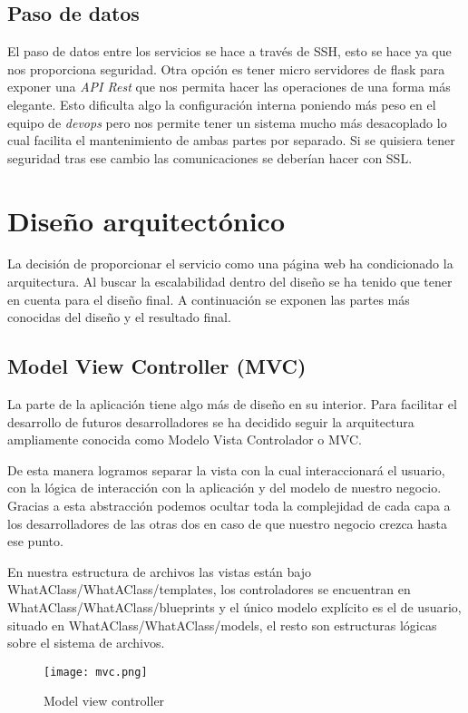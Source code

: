 \subsection{Paso de datos}

El paso de datos entre los servicios se hace a través de SSH, esto se hace ya que nos proporciona seguridad. Otra opción es tener micro servidores de flask para exponer una \emph{API Rest} que nos permita hacer las operaciones de una forma más elegante. Esto dificulta algo la configuración interna poniendo más peso en el equipo de \emph{devops} pero nos permite tener un sistema mucho más desacoplado lo cual facilita el mantenimiento de ambas partes por separado. Si se quisiera tener seguridad tras ese cambio las comunicaciones se deberían hacer con SSL. 


\section{Diseño arquitectónico}
La decisión de proporcionar el servicio como una página web ha condicionado la arquitectura. Al buscar la escalabilidad dentro del diseño se ha tenido que tener en cuenta para el diseño final. A continuación se exponen las partes más conocidas del diseño y el resultado final.

\subsection{Model View Controller (MVC)}

La parte de la aplicación tiene algo más de diseño en su interior. Para facilitar el desarrollo de futuros desarrolladores se ha decidido seguir la arquitectura ampliamente conocida como Modelo Vista Controlador o MVC. 

De esta manera logramos separar la vista con la cual interaccionará el usuario, con la lógica de interacción con la aplicación y del modelo de nuestro negocio. Gracias a esta abstracción podemos ocultar toda la complejidad de cada capa a los desarrolladores de las otras dos en caso de que nuestro negocio crezca hasta ese punto.

En nuestra estructura de archivos las vistas están bajo WhatAClass/WhatAClass/templates, los controladores se encuentran en WhatAClass/WhatAClass/blueprints y el único modelo explícito es el de usuario, situado en WhatAClass/WhatAClass/models, el resto son estructuras lógicas sobre el sistema de archivos.


\begin{figure}
	\centering
	\texttt{[image: mvc.png]}
	\caption{Model view controller}\label{fig:mvc.png}
\end{figure}



